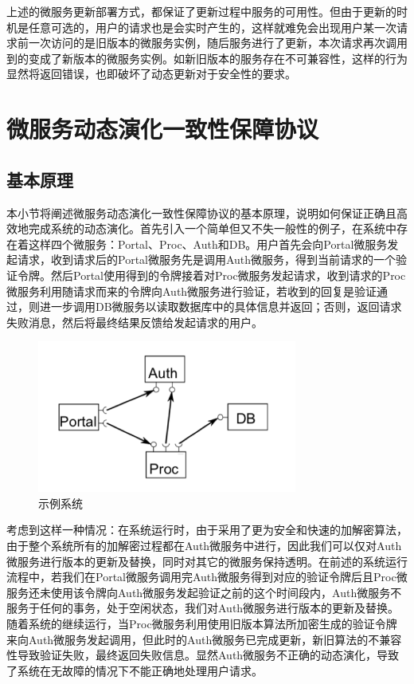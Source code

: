 \documentclass[12pt,a4paper]{article}
\theoremstyle{definition}
\begin{document}
上述的微服务更新部署方式，都保证了更新过程中服务的可用性。但由于更新的时机是任意可选的，用户的请求也是会实时产生的，这样就难免会出现用户某一次请求前一次访问的是旧版本的微服务实例，随后服务进行了更新，本次请求再次调用到的变成了新版本的微服务实例。如新旧版本的服务存在不可兼容性，这样的行为显然将返回错误，也即破坏了动态更新对于安全性的要求。

\newpage
\section{微服务动态演化一致性保障协议}\label{section:version_consistency}

\subsection{基本原理}
本小节将阐述微服务动态演化一致性保障协议的基本原理，说明如何保证正确且高效地完成系统的动态演化。首先引入一个简单但又不失一般性的例子，在系统中存在着这样四个微服务：Portal、Proc、Auth和DB。用户首先会向Portal微服务发起请求，收到请求后的Portal微服务先是调用Auth微服务，得到当前请求的一个验证令牌。然后Portal使用得到的令牌接着对Proc微服务发起请求，收到请求的Proc微服务利用随请求而来的令牌向Auth微服务进行验证，若收到的回复是验证通过，则进一步调用DB微服务以读取数据库中的具体信息并返回；否则，返回请求失败消息，然后将最终结果反馈给发起请求的用户。
\begin{figure}[ht]
 \centering
 \includegraphics[height=5cm]{images/Example.png}
 \caption{示例系统}
 \label{fig:Example}
\end{figure}


考虑到这样一种情况：在系统运行时，由于采用了更为安全和快速的加解密算法，由于整个系统所有的加解密过程都在Auth微服务中进行，因此我们可以仅对Auth微服务进行版本的更新及替换，同时对其它的微服务保持透明。在前述的系统运行流程中，若我们在Portal微服务调用完Auth微服务得到对应的验证令牌后且Proc微服务还未使用该令牌向Auth微服务发起验证之前的这个时间段内，Auth微服务不服务于任何的事务，处于空闲状态，我们对Auth微服务进行版本的更新及替换。随着系统的继续运行，当Proc微服务利用使用旧版本算法所加密生成的验证令牌来向Auth微服务发起调用，但此时的Auth微服务已完成更新，新旧算法的不兼容性导致验证失败，最终返回失败信息。显然Auth微服务不正确的动态演化，导致了系统在无故障的情况下不能正确地处理用户请求。
\end{document}
